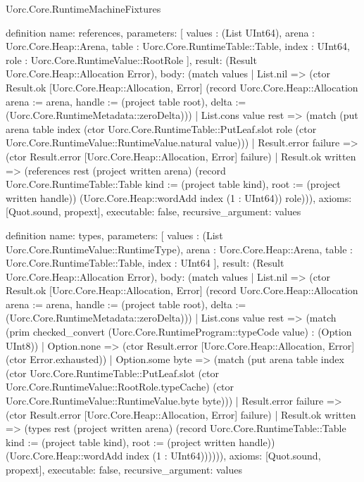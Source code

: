 \begin{lexlean}{Uorc.Core.RuntimeMachineFixtures}
\begin{semanticmodule}
definition{
  name: references,
  parameters: [
    values : (List UInt64),
    arena : Uorc.Core.Heap::Arena,
    table : Uorc.Core.RuntimeTable::Table,
    index : UInt64,
    role : Uorc.Core.RuntimeValue::RootRole
  ],
  result: (Result Uorc.Core.Heap::Allocation Error),
  body: (match values
    | List.nil => (ctor Result.ok [Uorc.Core.Heap::Allocation, Error] (record Uorc.Core.Heap::Allocation {arena := arena, handle := (project table root), delta := (Uorc.Core.RuntimeMetadata::zeroDelta)}))
    | List.cons value rest => (match (put arena table index (ctor Uorc.Core.RuntimeTable::PutLeaf.slot role (ctor Uorc.Core.RuntimeValue::RuntimeValue.natural value)))
      | Result.error failure => (ctor Result.error [Uorc.Core.Heap::Allocation, Error] failure)
      | Result.ok written => (references rest (project written arena) (record Uorc.Core.RuntimeTable::Table {kind := (project table kind), root := (project written handle)}) (Uorc.Core.Heap::wordAdd index (1 : UInt64)) role))),
  axioms: [Quot.sound, propext],
  executable: false,
  recursive_argument: values
}

definition{
  name: types,
  parameters: [
    values : (List Uorc.Core.RuntimeValue::RuntimeType),
    arena : Uorc.Core.Heap::Arena,
    table : Uorc.Core.RuntimeTable::Table,
    index : UInt64
  ],
  result: (Result Uorc.Core.Heap::Allocation Error),
  body: (match values
    | List.nil => (ctor Result.ok [Uorc.Core.Heap::Allocation, Error] (record Uorc.Core.Heap::Allocation {arena := arena, handle := (project table root), delta := (Uorc.Core.RuntimeMetadata::zeroDelta)}))
    | List.cons value rest => (match (prim checked_convert (Uorc.Core.RuntimeProgram::typeCode value) : (Option UInt8))
      | Option.none => (ctor Result.error [Uorc.Core.Heap::Allocation, Error] (ctor Error.exhausted))
      | Option.some byte => (match (put arena table index (ctor Uorc.Core.RuntimeTable::PutLeaf.slot (ctor Uorc.Core.RuntimeValue::RootRole.typeCache) (ctor Uorc.Core.RuntimeValue::RuntimeValue.byte byte)))
        | Result.error failure => (ctor Result.error [Uorc.Core.Heap::Allocation, Error] failure)
        | Result.ok written => (types rest (project written arena) (record Uorc.Core.RuntimeTable::Table {kind := (project table kind), root := (project written handle)}) (Uorc.Core.Heap::wordAdd index (1 : UInt64)))))),
  axioms: [Quot.sound, propext],
  executable: false,
  recursive_argument: values
}


\end{semanticmodule}
\end{lexlean}
